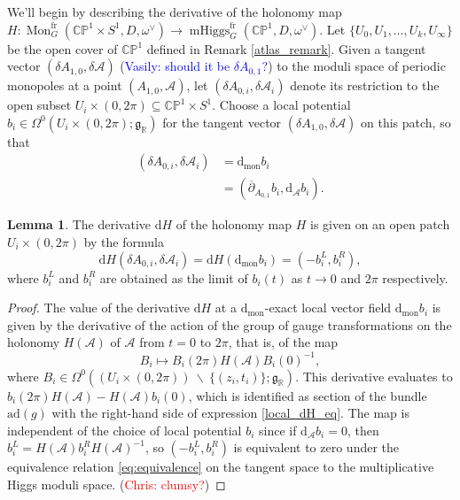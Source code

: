 \documentclass[11pt, oneside, reqno]{amsart}
\theoremstyle{definition} \newtheorem{definition}{Definition}[section]
\newtheorem{lemma}[definition]{Lemma}
\theoremstyle{definition} \newtheorem{remark}[definition]{Remark}
\theoremstyle{definition} \newtheorem{remarks}[definition]{Remarks}
\theoremstyle{definition} \newtheorem{question}[definition]{Question}
\theoremstyle{definition} \newtheorem*{note}{Note}
\theoremstyle{definition} \newtheorem{example}[definition]{Example}
\theoremstyle{definition} \newtheorem{examples}[definition]{Examples}
\renewcommand{\gg}{\mathfrak{g}}
\newcommand{\bb}[1]{\mathbb{#1}}
\newcommand{\mr}[1]{\mathrm{#1}}
\newcommand{\mc}[1]{\mathcal{#1}}
\newcommand{\bs}{\ \backslash \ }
\newcommand{\dd}{\partial}
\newcommand{\ol}[1]{\overline{#1}}
\newcommand{\RR}{\mathbb{R}}
\newcommand{\sub}{\subseteq}
\DeclareMathOperator{\mhiggs}{mHiggs}
\DeclareMathOperator{\mon}{Mon}
\renewcommand{\d}{\mathrm{d}}
\newcommand{\fr}{\mathrm{fr}}
\newcommand{\ad}{\mr{ad}}
\newcommand{\chris}[1]{(\textcolor{red}{Chris: #1})}
\newcommand{\vasily}[1]{(\textcolor{blue}{Vasily: #1})}
\begin{document}
We'll begin by describing the derivative of the holonomy map $H \colon \mon_G^\fr(\bb{CP}^1 \times S^1, D, \omega^\vee) \to \mhiggs^\fr_G(\bb{CP}^1, D, \omega^\vee)$. Let $\{U_0, U_1, \ldots, U_k, U_\infty\}$ be the open cover of $\bb{CP}^1$ defined in Remark \ref{atlas_remark}.  Given a tangent vector $(\delta A_{1,0}, \delta \mc A)$ \vasily{should it be $\delta A_{0,1}$?} to the moduli space of periodic monopoles at a point $(A_{1,0},\mc A)$, let $(\delta A_{0,i}, \delta \mc A_i)$ denote its restriction to the open subset $U_i \times (0, 2\pi) \sub \bb{CP}^1 \times S^1$.  Choose a local potential $b_i \in \Omega^0(U_i \times (0,2\pi); \gg_\RR)$ for the tangent vector $(\delta A_{1,0}, \delta \mc A)$ on this patch, so that
\begin{align*} 
(\delta A_{0,i}, \delta \mc A_i) &= \d_{\mr{mon}} b_i \\
&= (\ol \dd_{A_{0,1}} b_i, \mr d_{\mc A} b_i).
\end{align*}

\begin{lemma} \label{local_derivative_description_lemma}
The derivative $\d H$ of the holonomy map $H$ is given on an open patch $U_i \times (0,2\pi)$ by the formula
\begin{equation}
\label{local_dH_eq}
\d H(\delta A_{0,i}, \delta \mc A_i) = \d H(\d_{\mr{mon}} b_i) = (- b_i^L, b_i^R),
\end{equation}
where $b_i^L$ and $b_i^R$ are obtained as the limit of $b_i(t)$ as $t \to 0$ and $2\pi$ respectively.
\end{lemma}

\begin{proof}
The value of the derivative $\d H$ at a $\d_{\mr{mon}}$-exact local vector field $\d_{\mr{mon}} b_i$ is given by the derivative of the action of the group of gauge transformations on the holonomy $H(\mc A)$ of $\mc A$ from $t=0$ to $2\pi$, that is, of the map 
\[B_i \mapsto B_i(2\pi)H(\mc A)B_i(0)^{-1},\]
where $B_i \in \Omega^0((U_i \times (0,2\pi)) \bs \{(z_i, t_i)\}; \gg_\RR)$.  This derivative evaluates to $b_i(2\pi) H(\mc A) - H(\mc A)b_i(0)$, which is identified as section of the bundle $\ad(g)$ with the right-hand side of expression \ref{local_dH_eq}.  The map is independent of the choice of local potential $b_i$ since if $\d_{\mc A} b_i = 0$, then $b_i^L = H(\mc A) b_i^R H(\mc A)^{-1}$, so $(-b_i^L, b_i^R)$ is equivalent to zero under the equivalence relation \ref{eq:equivalence} on the tangent space to the multiplicative Higgs moduli space. \chris{clumsy?}
\end{proof}
\end{document}
